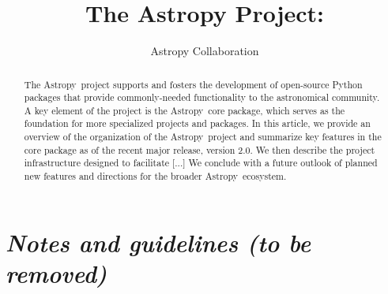 \documentclass[modern]{aastex61}
\newcommand{\astropy}{Astropy}
\begin{document}
\draft{\today}

\title{The Astropy Project: }


\author{Astropy Collaboration}

\begin{abstract}
The \astropy\ project supports and fosters the development of open-source Python
packages that provide commonly-needed functionality to the astronomical
community.
A key element of the project is the \astropy\ core package, which serves as the
foundation for more specialized projects and packages.
In this article, we provide an overview of the organization of the \astropy\
project and summarize key features in the core package as of the recent major
release, version 2.0.
We then describe the project infrastructure designed to facilitate [...]
We conclude with a future outlook of planned new features and directions for the
broader \astropy\ ecosystem.
\end{abstract}

\keywords{}

\section*{\textit{Notes and guidelines (to be removed)}}
\end{document}
